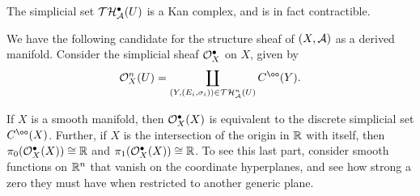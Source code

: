 \begin{prop}\label{kan-complexes}
The simplicial set $\mathcal T \mathcal H_\mathcal A^\bullet(U)$ is a Kan complex, and is in fact contractible.
\end{prop}


We have the following candidate for the structure sheaf of $(X, \mathcal A)$ as a derived manifold. Consider the simplicial sheaf $\mathcal O_X^\bullet$ on $X$, given by
\[ \cO_X^n(U) = \coprod_{(Y, (E_i, \sigma_i)) \in \cT \cH_\cA^n(U)} C^\oo(Y). \]

\begin{speculation}
If $X$ is a smooth manifold, then $\mathcal O_X^\bullet(X)$ is equivalent to the discrete simplicial set $C^\oo(X)$. Further, if $X$ is the intersection of the origin in $\mathbb R$ with itself, then $\pi_0(\mathcal O_X^\bullet(X)) \cong \mathbb R$ and $\pi_1(\mathcal O_X^\bullet(X)) \cong \mathbb R$. To see this last part, consider smooth functions on $\mathbb R^n$ that vanish on the coordinate hyperplanes, and see how strong a zero they must have when restricted to another generic plane.
\end{speculation}